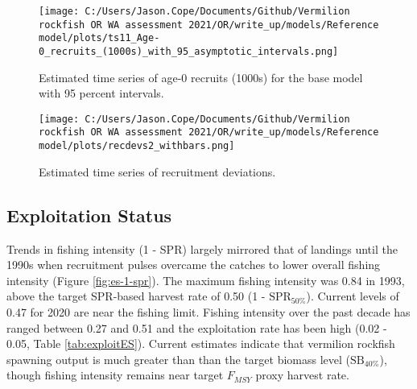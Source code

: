 \documentclass[11pt,
  english,
  a4paper,
]{article}
\begin{document}

\begin{figure}
\centering
\texttt{[image: C:/Users/Jason.Cope/Documents/Github/Vermilion rockfish OR WA assessment 2021/OR/write\_up/models/Reference model/plots/ts11\_Age-0\_recruits\_(1000s)\_with\_95\_asymptotic\_intervals.png]}
\caption{Estimated time series of age-0 recruits (1000s) for the base model with 95 percent intervals.\label{fig:es-recruits}}
\end{figure}

\tagmcend\tagstructend


\begin{figure}
\centering
\texttt{[image: C:/Users/Jason.Cope/Documents/Github/Vermilion rockfish OR WA assessment 2021/OR/write\_up/models/Reference model/plots/recdevs2\_withbars.png]}
\caption{Estimated time series of recruitment deviations.\label{fig:es-rec-devs}}
\end{figure}

\tagmcend\tagstructend

\clearpage


\hypertarget{exploitation-status}{%
\subsection*{Exploitation Status}\label{exploitation-status}}

\leavevmode\tagmcend\tagstructend


Trends in fishing intensity (1 - SPR) largely mirrored that of landings until the 1990s when recruitment pulses overcame the catches to lower overall fishing intensity (Figure \ref{fig:es-1-spr}). The maximum fishing intensity was 0.84 in 1993, above the target SPR-based harvest rate of 0.50 (1 - {\(\text{SPR}_{50\%}\)\leavevmode\tagmcend\tagstructend}). Current levels of 0.47 for 2020 are near the fishing limit. Fishing intensity over the past decade has ranged between 0.27 and 0.51 and the exploitation rate has been high (0.02 - 0.05, Table \ref{tab:exploitES}). Current estimates indicate that vermilion rockfish spawning output is much greater than than the target biomass level ({\(\text{SB}_{40\%}\)\leavevmode\tagmcend\tagstructend}), though fishing intensity remains near target {\(F_{MSY}\)\leavevmode\tagmcend\tagstructend} proxy harvest rate.
\end{document}
